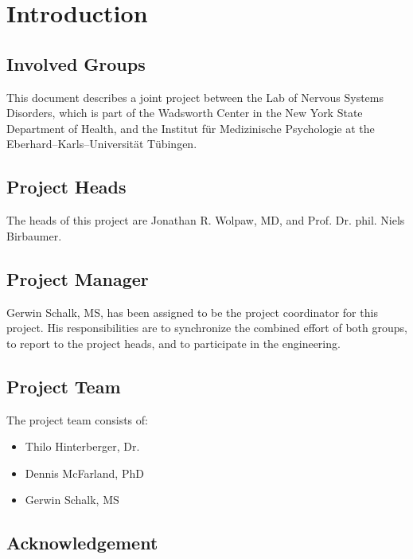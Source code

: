 \documentclass[letterpaper,oneside,12pt]{book}
\begin{document}
\frontmatter


\tableofcontents

\mainmatter

\chapter{Introduction}

\section{Involved Groups}

This document describes a joint project between the Lab of Nervous Systems 
Disorders, which is part of the Wadsworth Center in the New York State 
Department of Health, and the Institut f\"ur Medizinische Psychologie at the 
Eberhard--Karls--Universit\"at T\"ubingen.

\section{Project Heads}

The heads of this project are Jonathan R. Wolpaw, MD, and Prof. Dr. phil. Niels 
Birbaumer.

\section{Project Manager}

Gerwin Schalk, MS, has been assigned to be the project coordinator for this 
project. His responsibilities are to synchronize the combined effort of both 
groups, to report to the project heads, and to participate in the engineering.

\section{Project Team}

The project team consists of:
\begin{itemize}
 \item{Thilo Hinterberger, Dr.}
 \item{Dennis McFarland, PhD}
 \item{Gerwin Schalk, MS}
\end{itemize}


\section{Acknowledgement}
\end{document}

